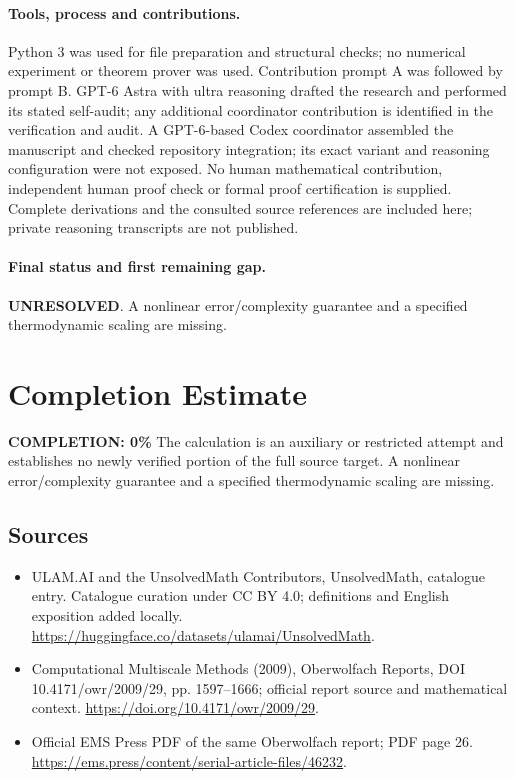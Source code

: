 \documentclass[11pt]{article}
\begin{document}
\paragraph{Tools, process and contributions.}
Python 3 was used for file preparation and structural checks; no numerical experiment or theorem prover was used. Contribution prompt A was followed by prompt B. GPT-6 Astra with ultra reasoning drafted the research and performed its stated self-audit; any additional coordinator contribution is identified in the verification and audit. A GPT-6-based Codex coordinator assembled the manuscript and checked repository integration; its exact variant and reasoning configuration were not exposed. No human mathematical contribution, independent human proof check or formal proof certification is supplied. Complete derivations and the consulted source references are included here; private reasoning transcripts are not published.

\paragraph{Final status and first remaining gap.}
\textbf{UNRESOLVED}. A nonlinear error/complexity guarantee and a specified thermodynamic scaling are missing.

\section{Completion Estimate}
\noindent\textbf{COMPLETION: 0\%}
The calculation is an auxiliary or restricted attempt and establishes no newly verified portion of the full source target. A nonlinear error/complexity guarantee and a specified thermodynamic scaling are missing.

\subsection{Sources}
\begin{itemize}
\item[\hypertarget{source:statement:1}{S1}] ULAM.AI and the UnsolvedMath Contributors, UnsolvedMath, catalogue entry. Catalogue curation under CC BY 4.0; definitions and English exposition added locally.
\url{https://huggingface.co/datasets/ulamai/UnsolvedMath}.
\item[\hypertarget{source:statement:2}{S2}] Computational Multiscale Methods (2009), Oberwolfach Reports, DOI 10.4171/owr/2009/29, pp. 1597--1666; official report source and mathematical context.
\url{https://doi.org/10.4171/owr/2009/29}.
\item[\hypertarget{source:statement:3}{S3}] Official EMS Press PDF of the same Oberwolfach report; PDF page 26.
\url{https://ems.press/content/serial-article-files/46232}.
\end{itemize}
\label{end:statement}
\end{document}
